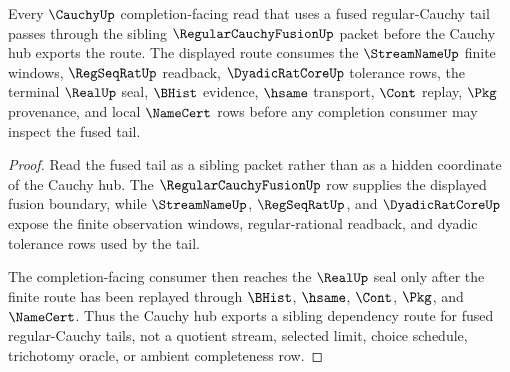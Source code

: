 \begin{theorem}
\label{thm:cauchy-orphan-regular-cauchy-fusion-forward-route}
Every $\CauchyUp$ completion-facing read that uses a fused regular-Cauchy tail passes through the sibling $\RegularCauchyFusionUp$ packet before the Cauchy hub exports the route. The displayed route consumes the $\StreamNameUp$ finite windows, $\RegSeqRatUp$ readback, $\DyadicRatCoreUp$ tolerance rows, the terminal $\RealUp$ seal, $\BHist$ evidence, $\hsame$ transport, $\Cont$ replay, $\Pkg$ provenance, and local $\NameCert$ rows before any completion consumer may inspect the fused tail.
\end{theorem}
\begin{proof}
Read the fused tail as a sibling packet rather than as a hidden coordinate of the Cauchy hub. The $\RegularCauchyFusionUp$ row supplies the displayed fusion boundary, while $\StreamNameUp$, $\RegSeqRatUp$, and $\DyadicRatCoreUp$ expose the finite observation windows, regular-rational readback, and dyadic tolerance rows used by the tail.

The completion-facing consumer then reaches the $\RealUp$ seal only after the finite route has been replayed through $\BHist$, $\hsame$, $\Cont$, $\Pkg$, and $\NameCert$. Thus the Cauchy hub exports a sibling dependency route for fused regular-Cauchy tails, not a quotient stream, selected limit, choice schedule, trichotomy oracle, or ambient completeness row.
\end{proof}
